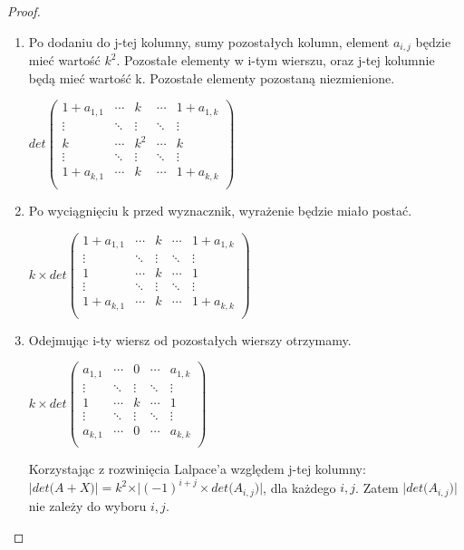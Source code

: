 \begin{proof}
\begin{enumerate}
\item Po dodaniu do j-tej kolumny, sumy pozostałych kolumn, element $a_{i,j}$ będzie mieć wartość $k^2$. Pozostałe elementy w i-tym wierszu, oraz j-tej kolumnie będą mieć wartość k. Pozostałe elementy pozostaną niezmienione. \\
\begin{center}
$det \begin{pmatrix}
 1+a_{1,1} & \cdots & k & \cdots &  1+a_{1,k} \\
 \vdots & \ddots & \vdots & \ddots & \vdots \\
  k & \cdots & k^2 & \cdots & k \\ 
 \vdots & \ddots & \vdots & \ddots & \vdots \\
 1+a_{k,1} & \cdots & k & \cdots &  1+a_{k,k} \\
\end{pmatrix}$ \\
\end{center}

\item Po wyciągnięciu k przed wyznacznik, wyrażenie będzie miało postać. \\
\begin{center}
$k \times det \begin{pmatrix}
 1+a_{1,1} & \cdots & k & \cdots &  1+a_{1,k} \\
 \vdots & \ddots & \vdots & \ddots & \vdots \\
  1 & \cdots & k & \cdots & 1 \\ 
 \vdots & \ddots & \vdots & \ddots & \vdots \\
 1+a_{k,1} & \cdots & k & \cdots &  1+a_{k,k} \\
\end{pmatrix}$ \\
\end{center}
\item Odejmując i-ty wiersz od pozostałych wierszy otrzymamy. 
\begin{center}
$k \times det \begin{pmatrix}
 a_{1,1} & \cdots & 0 & \cdots &  a_{1,k} \\
 \vdots & \ddots & \vdots & \ddots & \vdots \\
  1 & \cdots & k & \cdots & 1 \\ 
 \vdots & \ddots & \vdots & \ddots & \vdots \\
 a_{k,1} & \cdots & 0 & \cdots &  a_{k,k} \\
\end{pmatrix}$ \\
\end{center}

Korzystając z rozwinięcia Lalpace'a względem j-tej kolumny: \\ $\vert det  \big(A+X \big) \vert = k^2 \times \vert (-1)^{i+j} \times det \big( A_{i,j} \big) \vert$, dla każdego $i, j$. Zatem $\vert det \big( A_{i,j} \big) \vert$ nie zależy do wyboru $i, j$. 

\end{enumerate}


\end{proof}



